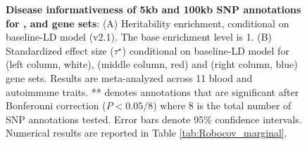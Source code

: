 \newpage
\begin{figure}[h!]
\centering
{}
\caption{\small {\textbf{Disease informativeness of 5kb and 100kb SNP annotations for \Corspan{}, \Robospan{} and \pRobospan{} gene sets}: (A) Heritability enrichment, conditional on baseline-LD model (v2.1). The base enrichment level is 1. (B) Standardized effect size ($\tau^{\star}$) conditional on baseline-LD model for \Corspan{} (left column, white), \Robospan{} (middle column, red) and \pRobospan{} (right column, blue) gene sets. Results are meta-analyzed across 11 blood and autoimmune traits. ** denotes annotations that are significant after Bonferonni correction ($P < 0.05/8$) where $8$ is the total number of SNP annotations tested. Error bars denote 95$\%$ confidence intervals. Numerical results are reported in Table \ref{tab:Robocov_marginal}.}}
\label{fig:Robocov_marginal}
\end{figure}

